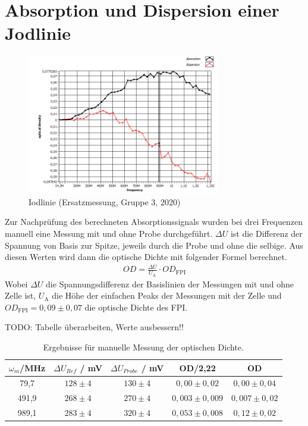 
\newpage
\section{Absorption und Dispersion einer Jodlinie}


\begin{figure}[h]
    \centering
    \includegraphics[width=0.75\textwidth]{Bilder/Jodlinie/Gruppe32020Iododgraph1 Kopie.png}
    \caption[Iodlinie]{Iodlinie (Ersatzmessung, Gruppe 3, 2020)}
\end{figure}


Zur Nachprüfung des berechneten Absorptionssignals wurden bei drei Frequenzen manuell eine Messung mit und ohne Probe durchgeführt. $\Delta U$ ist die Differenz der Spannung von Basis zur Spitze, jeweils durch die Probe und ohne die selbige. Aus diesen Werten wird dann die optische Dichte mit folgender Formel berechnet.
\begin{align}
    OD = \frac{\Delta U}{U_\mathrm{A}} \cdot OD_\mathrm{FPI}
\end{align}
Wobei $\Delta U$ die Spannungsdifferenz der Basislinien der Messungen mit und ohne Zelle ist, $U_\mathrm{A}$ die Höhe der einfachen Peaks der Messungen mit der Zelle und $OD_\mathrm{FPI} = 0,09 \pm 0,07$ die optische Dichte des FPI.


TODO: Tabelle überarbeiten, Werte ausbessern!!
\begin{table}[h]
    \centering
    \begin{tabular}{c|cc|cc}
        $\omega_m$/MHz & $\Delta U_{Ref}$ / mV & $\Delta U_{Probe}$ / mV & OD/2,22 & OD \\ \hline
        79,7 & $128 \pm 4$ & $130 \pm 4$ & $0,00 \pm 0,02$ & $0,00 \pm 0,04$ \\
        491,9 & $268 \pm 4$ & $270 \pm 4$ & $0,003 \pm 0,009$ & $0,007 \pm 0,02$ \\
        989,1 & $283 \pm 4$ & $320 \pm 4$ & $0,053 \pm 0,008$ & $0,12 \pm 0,02$ \\
    \end{tabular}
    \caption{Ergebnisse für manuelle Messung der optischen Dichte.}
\end{table}

